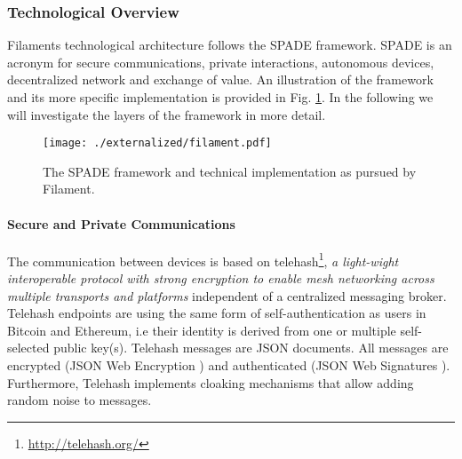 \subsubsection{Technological Overview}

Filaments technological architecture follows the SPADE framework. SPADE is an acronym for secure communications, private interactions, autonomous devices, decentralized network and exchange of value. An illustration of the framework and its more specific implementation is provided in Fig. \ref{fig:filament}. In the following we will investigate the layers of the framework in more detail. 

\begin{figure}
\centering
\texttt{[image: ./externalized/filament.pdf]}
\caption{The SPADE framework and technical implementation as pursued by Filament.}
\label{fig:filament}
\end{figure}


\paragraph{Secure and Private Communications}
The communication between devices is based on telehash\footnote{\url{http://telehash.org/}}, \emph{a light-wight interoperable protocol with strong encryption to enable mesh networking across multiple transports and platforms} independent of a centralized messaging broker.  Telehash endpoints are using the same form of self-authentication as users in Bitcoin and Ethereum, i.e their identity is derived from one or multiple self-selected public key(s). Telehash messages are JSON documents. All messages are encrypted (JSON Web Encryption \cite{rfc7516}) and authenticated (JSON Web Signatures \cite{rfc7515}). Furthermore, Telehash implements cloaking mechanisms that allow adding random noise to messages.


